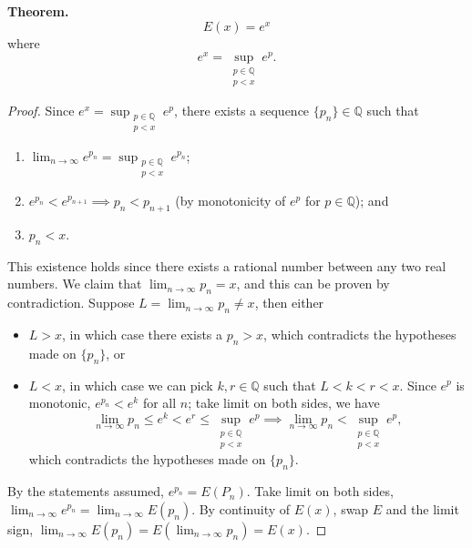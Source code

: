 \documentclass{article}
\begin{document}
\textbf{Theorem.} $$E(x)=e^x$$ where $$e^x=\displaystyle\sup_{\substack{p\in\mathbb{Q}\\p<x}}e^p.$$
\begin{proof}
Since $e^x=\displaystyle\sup_{\substack{p\in\mathbb{Q}\\p<x}}e^p$, there exists a sequence $\{p_n\}\in\mathbb{Q}$ such that
\begin{enumerate}
\item $\lim_{n\to\infty}e^{p_n}=\displaystyle\sup_{\substack{p\in\mathbb{Q}\\p<x}}e^{p_n}$;
\item $e^{p_n}<e^{p_{n+1}}\implies p_n<p_{n+1}$ (by monotonicity of $e^p$ for $p\in\mathbb{Q}$); and
\item $p_n<x$.
\end{enumerate}
This existence holds since there exists a rational number between any two real numbers. We claim that $\lim_{n\to\infty}p_n=x$, and this can be proven by contradiction. Suppose $L=\lim_{n\to\infty}p_n\neq x$, then either
\begin{itemize}
\item $L>x$, in which case there exists a $p_n>x$, which contradicts the hypotheses made on $\{p_n\}$, or
\item $L<x$, in which case we can pick $k,r\in\mathbb{Q}$ such that $L<k<r<x$. Since $e^p$ is monotonic, $e^{p_n}<e^k$ for all $n$; take limit on both sides, we have
$$
\lim_{n\to\infty}p_n\leq e^k<e^r\leq\sup_{\substack{p\in\mathbb{Q}\\p<x}}e^p\implies\lim_{n\to\infty}p_n<\sup_{\substack{p\in\mathbb{Q}\\p<x}}e^p,
$$
which contradicts the hypotheses made on $\{p_n\}$.
\end{itemize}

By the statements assumed, $e^{p_n}=E(P_n)$. Take limit on both sides, $\lim_{n\to\infty}e^{p_n}=\lim_{n\to\infty}E(p_n)$. By continuity of $E(x)$, swap $E$ and the limit sign, $\lim_{n\to\infty}E(p_n)=E(\lim_{n\to\infty}p_n)=E(x)$.
\end{proof}
\end{document}

